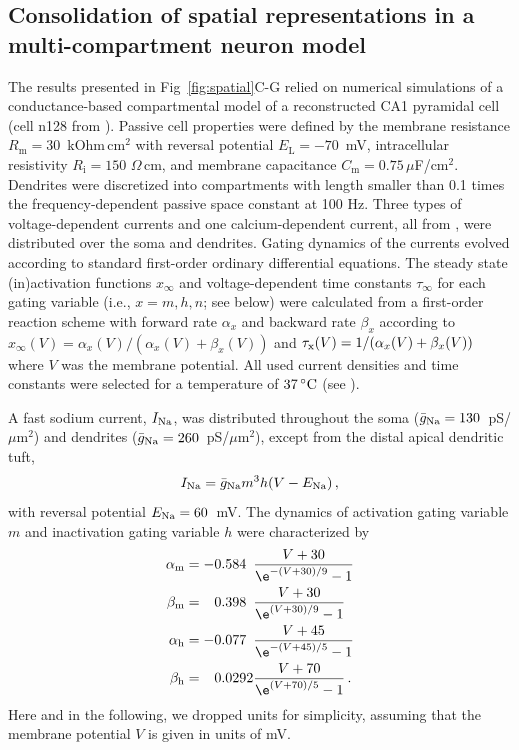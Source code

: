 \subsection{Consolidation of spatial representations in a multi-compartment neuron model}%
\label{ssec:ppt_methods_multicompartment}
The results presented in Fig~\ref{fig:spatial}C-G relied on numerical simulations of a conductance-based compartmental model of a reconstructed CA1 pyramidal cell (cell n128 from \cite{Cannon1998}). Passive cell properties were defined by the membrane resistance $R_\textrm{m}=30$~kOhm\,cm$^2$ with reversal potential $E_\textrm{L}=-70$~mV, intracellular resistivity $R_\textrm{i} = 150$ $\Omega\,$cm, and membrane capacitance $C_\textrm{m} = 0.75\,\mu$F/cm$^2$. Dendrites were discretized into compartments with length smaller than 0.1 times the frequency-dependent passive space constant at 100 Hz. Three types of voltage-dependent currents and one calcium-dependent current, all from \cite{Mainen1996}, were distributed over the soma and dendrites. Gating dynamics of the currents evolved according to standard first-order ordinary differential equations. The steady state (in)activation functions $x_\infty$ and voltage-dependent time constants $\tau_\infty$ for each gating variable (i.e., $x=m,h,n$; see below) were calculated from a first-order reaction scheme with forward rate $\alpha_x$ and backward rate $\beta_x$ according to $x_\infty(V)=\alpha_x(V)/(\alpha_x(V)+\beta_x(V))$ and $\tau_{\rm x}(V)=1/(\alpha_x(V)+\beta_x(V))$ where $V$ was the membrane potential. All used current densities and time constants were selected for a temperature of $37\,^{\circ}{\rm C}$ (see \cite{Mainen1996}).

A fast sodium current, $I_{\rm Na}$, was distributed throughout the soma ($\bar{g}_{\rm Na}=130$~pS/$\mu$m$^2$) and dendrites ($\bar{g}_{\rm Na}=260$~pS/$\mu$m$^2$), except from the distal apical dendritic tuft,
\begin{align}
I_{\rm Na}= \bar{g}_{\rm Na} m^3 h (V - E_{\rm Na}) \,,
\end{align}
with reversal potential $E_{\rm Na}=60$~mV. The dynamics of activation gating variable $m$ and inactivation gating variable $h$ were characterized by
\begin{equation}
\begin{alignedat}{3}
\alpha_{\rm m} &= - && 0.584  && \frac{V+30}{\e^{-(V+30)/9} - 1} \\
\beta_{\rm m}  &=   && 0.398  && \frac{V+30}{\e^{ (V+30)/9} - 1} \\
\alpha_{\rm h} &= - && 0.077  && \frac{V+45}{\e^{-(V+45)/5} - 1} \\
\beta_{\rm h}  &=   && 0.0292 && \frac{V+70}{\e^{ (V+70)/5} - 1}\,.
\end{alignedat}
\end{equation}
Here and in the following, we dropped units for simplicity, assuming that the membrane potential $V$ is given in units of mV.

